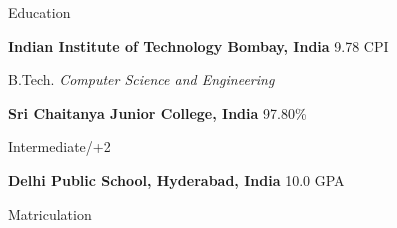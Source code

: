 \begin{rubric}{Education}

\entry*[2019 -- 2021*]%
	\textbf{Indian Institute of Technology Bombay, India} \hfill 9.78 CPI
	\par B.Tech. \emph{Computer Science and Engineering}


\entry*[2017 -- 2019]%
	\textbf{Sri Chaitanya Junior College, India} \hfill 97.80\% \par
	Intermediate/+2
	

\entry*[2010 -- 2017]%
	\textbf{Delhi Public School, Hyderabad, India} \hfill 10.0 GPA \par
	Matriculation
\end{rubric}